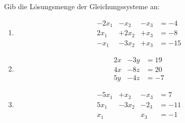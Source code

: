 Gib die Lösungsmenge der Gleichungssysteme an:
\begin{multicols}{3}
	\begin{enumerate}
		\item\begin{alignat*}{4}%
			-2x_1& -x_2& - x_3& = -4\\
			2x_1& +2x_2 & + x_3& = -8\\
			-x_1& -3x_2 & + x_3& =-15
		\end{alignat*}
		\item\begin{alignat*}{4}%
			2x&-3y&=19\\
			4x&-8z&=20\\
			5y&-4z&=-7
		\end{alignat*}
		\item\begin{alignat*}{4}
			-5x_1& +x_2& -x_3& = 7\\
			5x_1&  -3x_2& -2_3& = -11\\
			x_1& & x_3& =-1
		\end{alignat*}
	\end{enumerate}
\end{multicols}
